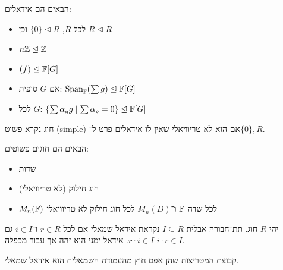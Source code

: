 \begin{example}
	הבאים הם אידאלים:
	\begin{itemize}
		\item לכל $R$, $\{ 0 \} \trianglelefteq R$ וכן $R \trianglelefteq R$
		\item $n \mathbb{Z} \trianglelefteq \mathbb{Z}$
		\item $(f) \trianglelefteq \mathbb{F}[G]$
		\item אם $G$ סופית: $\operatorname{Span}_{\mathbb{F}}(\sum g) \trianglelefteq \mathbb{F}[G]$
		\item לכל $G$: $\{ \sum \alpha_g g \mid \sum \alpha_g = 0 \} \trianglelefteq \mathbb{F}[G]$
	\end{itemize}
\end{example}
\begin{definition}
	חוג נקרא פשוט (simple) אם הוא לא טריוויאלי שאין לו אידאלים פרט ל־$\{ 0 \}, R$.
\end{definition}
\begin{example}
	הבאים הם חוגים פשוטים:
	\begin{itemize}
		\item שדות
		\item חוג חילוק (לא טריוויאלי)
		\item $M_n(\mathbb{F})$ לכל שדה $\mathbb{F}$ ו־$M_n(D)$ לכל חוג חילוק לא טריוויאלי
	\end{itemize}
\end{example}
\begin{definition}
	יהי $R$ חוג. תת־חבורה אבלית $I \subseteq R$ נקראת אידאל שמאלי אם לכל $r \in R$ ו־$i \in I$ גם $r \cdot i \in I$. אידאל ימני הוא זהה אך עבור מכפלה $i \cdot r \in I$.
\end{definition}
\begin{example}
	קבוצת המטריצות שהן אפס חוץ מהעמודה השמאלית הוא אידאל שמאלי.
\end{example}

